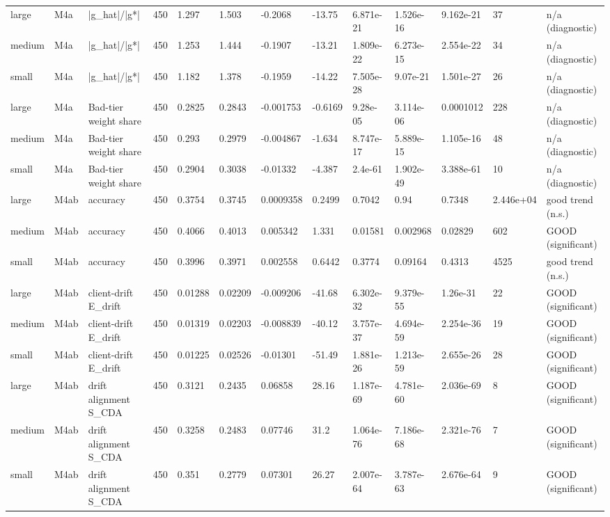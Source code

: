 \begin{table}[t]
\begin{tabular}{lllllllllllll}
large & M4a & |g\_hat|/|g*| & 450 & 1.297 & 1.503 & -0.2068 & -13.75 & 6.871e-21 & 1.526e-16 & 9.162e-21 & 37 & n/a (diagnostic) \\
medium & M4a & |g\_hat|/|g*| & 450 & 1.253 & 1.444 & -0.1907 & -13.21 & 1.809e-22 & 6.273e-15 & 2.554e-22 & 34 & n/a (diagnostic) \\
small & M4a & |g\_hat|/|g*| & 450 & 1.182 & 1.378 & -0.1959 & -14.22 & 7.505e-28 & 9.07e-21 & 1.501e-27 & 26 & n/a (diagnostic) \\
large & M4a & Bad-tier weight share & 450 & 0.2825 & 0.2843 & -0.001753 & -0.6169 & 9.28e-05 & 3.114e-06 & 0.0001012 & 228 & n/a (diagnostic) \\
medium & M4a & Bad-tier weight share & 450 & 0.293 & 0.2979 & -0.004867 & -1.634 & 8.747e-17 & 5.889e-15 & 1.105e-16 & 48 & n/a (diagnostic) \\
small & M4a & Bad-tier weight share & 450 & 0.2904 & 0.3038 & -0.01332 & -4.387 & 2.4e-61 & 1.902e-49 & 3.388e-61 & 10 & n/a (diagnostic) \\
large & M4ab & accuracy & 450 & 0.3754 & 0.3745 & 0.0009358 & 0.2499 & 0.7042 & 0.94 & 0.7348 & 2.446e+04 & good trend (n.s.) \\
medium & M4ab & accuracy & 450 & 0.4066 & 0.4013 & 0.005342 & 1.331 & 0.01581 & 0.002968 & 0.02829 & 602 & GOOD (significant) \\
small & M4ab & accuracy & 450 & 0.3996 & 0.3971 & 0.002558 & 0.6442 & 0.3774 & 0.09164 & 0.4313 & 4525 & good trend (n.s.) \\
large & M4ab & client-drift E\_drift & 450 & 0.01288 & 0.02209 & -0.009206 & -41.68 & 6.302e-32 & 9.379e-55 & 1.26e-31 & 22 & GOOD (significant) \\
medium & M4ab & client-drift E\_drift & 450 & 0.01319 & 0.02203 & -0.008839 & -40.12 & 3.757e-37 & 4.694e-59 & 2.254e-36 & 19 & GOOD (significant) \\
small & M4ab & client-drift E\_drift & 450 & 0.01225 & 0.02526 & -0.01301 & -51.49 & 1.881e-26 & 1.213e-59 & 2.655e-26 & 28 & GOOD (significant) \\
large & M4ab & drift alignment S\_CDA & 450 & 0.3121 & 0.2435 & 0.06858 & 28.16 & 1.187e-69 & 4.781e-60 & 2.036e-69 & 8 & GOOD (significant) \\
medium & M4ab & drift alignment S\_CDA & 450 & 0.3258 & 0.2483 & 0.07746 & 31.2 & 1.064e-76 & 7.186e-68 & 2.321e-76 & 7 & GOOD (significant) \\
small & M4ab & drift alignment S\_CDA & 450 & 0.351 & 0.2779 & 0.07301 & 26.27 & 2.007e-64 & 3.787e-63 & 2.676e-64 & 9 & GOOD (significant) \\

\end{tabular}
\end{table}

